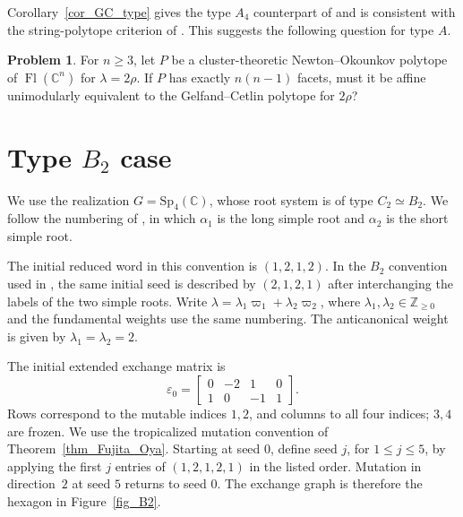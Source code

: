 \documentclass[10pt]{amsart}
\numberwithin{equation}{section}
\newcommand{\C}{{\mathbb{C}}}
\DeclareMathOperator{\flag}{Fl}
\theoremstyle{plain}
\theoremstyle{definition}
\newtheorem{Problem}[theorem]{Problem}
\theoremstyle{remark}
\begin{document}
Corollary~\ref{cor_GC_type} gives the type $A_4$ counterpart of
\cite[Corollary~3.4]{CFHL} and is consistent with the
string-polytope criterion of \cite[Theorem~A]{CKLP21}.
This suggests the following question for type $A$.
\begin{Problem}\label{Prob_GC_type}
	For $n\geq3$, let $P$ be a cluster-theoretic Newton--Okounkov
	polytope of $\flag(\C^n)$ for $\lambda=2\rho$.
	If $P$ has exactly $n(n-1)$ facets, must it be affine
	unimodularly equivalent to the Gelfand--Cetlin polytope for $2\rho$?
\end{Problem}


\section{Type $B_2$ case}\label{sec_B2}
We use the realization $G=\mathrm{Sp}_4(\mathbb C)$,
whose root system is of type $C_2\simeq B_2$.
We follow the numbering of
\cite[Example~6.33]{FujitaOya}, in which
$\alpha_1$ is the long simple root and
$\alpha_2$ is the short simple root.
\begin{center}
\end{center}
The initial reduced word in this convention is
$(1,2,1,2)$. In the $B_2$ convention used in
\cite[Remark~8.5]{FujitaOya}, the same initial seed is
described by $(2,1,2,1)$ after interchanging the labels of 
the two simple roots. 
Write
$\lambda=\lambda_1\varpi_1+\lambda_2\varpi_2$,
where $\lambda_1,\lambda_2\in\mathbb Z_{\geq0}$ and
the fundamental weights use the same numbering.
The anticanonical weight is given by
$\lambda_1=\lambda_2=2$. 


The initial extended exchange matrix is
\[
\varepsilon_0=
\begin{bmatrix}0&-2&1&0\\1&0&-1&1\end{bmatrix}.
\]
Rows correspond to the mutable indices $1,2$, and columns to
all four indices; $3,4$ are frozen. We use the tropicalized
mutation convention of Theorem~\ref{thm_Fujita_Oya}.
Starting at seed $0$, define seed $j$, for $1\leq j\leq5$,
by applying the first $j$ entries of $(1,2,1,2,1)$ in the
listed order. Mutation in direction~$2$ at seed $5$ returns
to seed $0$. The exchange graph is therefore the hexagon in Figure~\ref{fig_B2}. 
\end{document}
